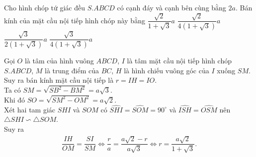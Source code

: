 \begin{ex}%
 Cho hình chóp tứ giác đều $S.ABCD$ có cạnh đáy và cạnh bên cùng bằng $2a$. Bán kính của mặt cầu nội tiếp hình chóp này bằng
 \choice
  {\True $\dfrac{\sqrt{2}}{1+\sqrt{3}}a$}
  {$\dfrac{\sqrt{2}}{4\left(1+\sqrt{3}\right)}a$}
  {$\dfrac{\sqrt{3}}{2\left(1+\sqrt{3}\right)}a$}
  {$\dfrac{\sqrt{3}}{4\left(1+\sqrt{3}\right)}a$}
 \loigiai
  {
  \immini
  {
  Gọi $O$ là tâm của hình vuông $ABCD$, $I$ là tâm mặt cầu nội tiếp hình chóp $S.ABCD$, $M$ là trung điểm của $BC$, $H$ là hình chiếu vuông góc của $I$ xuống $SM$. Suy ra bán kính mặt cầu nội tiếp là $r=IH=IO$.\\
  Ta có $SM=\sqrt{SB^2-BM^2}=a\sqrt{3}$.\\
  Khi đó $SO=\sqrt{SM^2-OM^2}=a\sqrt{2}$.\\
  Xét hai tam giác $SHI$ và $SOM$ có $\widehat{SHI}=\widehat{SOM}=90^\circ$ và $\widehat{ISH}=\widehat{OSM}$ nên $\triangle SHI \backsim \triangle SOM$.\\
  Suy ra
  \begin{eqnarray*}
   \dfrac{IH}{OM}=\dfrac{SI}{SM}\Leftrightarrow \dfrac{r}{a}=\dfrac{a\sqrt{2}-r}{a\sqrt{3}} \Leftrightarrow r=\dfrac{a\sqrt{2}}{1+\sqrt{3}}.
  \end{eqnarray*}
  }
  {
  }
  }
\end{ex}

